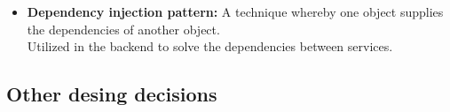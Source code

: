 \begin{itemize}
    \item
    \textbf{Dependency injection pattern:} A technique whereby one object supplies the dependencies of another object.\\
    Utilized in the backend to solve the dependencies between services.



\end{itemize}

\subsection{Other desing decisions}